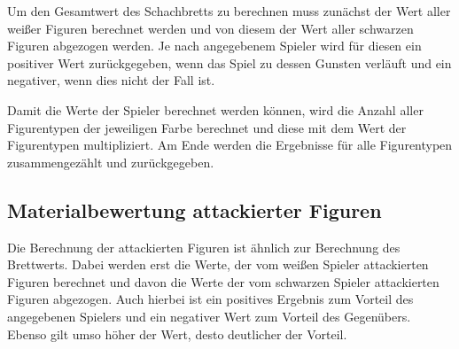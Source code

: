     Um den Gesamtwert des Schachbretts zu berechnen muss zunächst der Wert
aller weißer Figuren berechnet werden und von diesem der Wert aller
schwarzen Figuren abgezogen werden. Je nach angegebenem Spieler wird für
diesen ein positiver Wert zurückgegeben, wenn das Spiel zu dessen
Gunsten verläuft und ein negativer, wenn dies nicht der Fall ist.

Damit die Werte der Spieler berechnet werden können, wird die Anzahl
aller Figurentypen der jeweiligen Farbe berechnet und diese mit dem Wert
der Figurentypen multipliziert. Am Ende werden die Ergebnisse für alle
Figurentypen zusammengezählt und zurückgegeben.

    \subsection{Materialbewertung attackierter
Figuren}\label{materialbewertung-attackierter-figuren}

Die Berechnung der attackierten Figuren ist ähnlich zur Berechnung
des Brettwerts. Dabei werden erst die Werte, der vom
weißen Spieler attackierten Figuren berechnet und davon die Werte der
vom schwarzen Spieler attackierten Figuren abgezogen. Auch hierbei ist
ein positives Ergebnis zum Vorteil des angegebenen Spielers und ein
negativer Wert zum Vorteil des Gegenübers. Ebenso gilt umso höher der
Wert, desto deutlicher der Vorteil.

